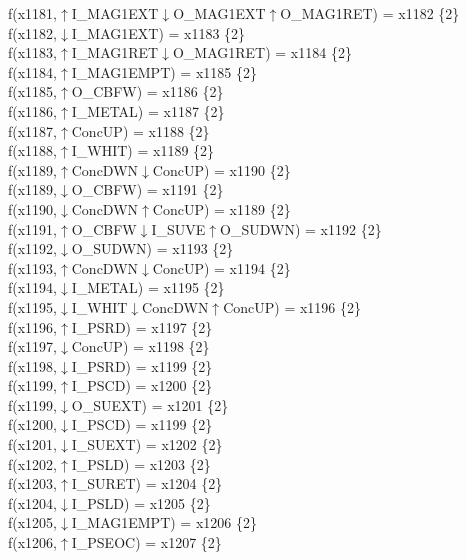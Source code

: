 f(x1181,$\uparrow$I\_MAG1EXT$\downarrow$O\_MAG1EXT$\uparrow$O\_MAG1RET) = x1182 \{2\} \\  
f(x1182,$\downarrow$I\_MAG1EXT) = x1183 \{2\} \\  
f(x1183,$\uparrow$I\_MAG1RET$\downarrow$O\_MAG1RET) = x1184 \{2\} \\  
f(x1184,$\uparrow$I\_MAG1EMPT) = x1185 \{2\} \\  
f(x1185,$\uparrow$O\_CBFW) = x1186 \{2\} \\  
f(x1186,$\uparrow$I\_METAL) = x1187 \{2\} \\  
f(x1187,$\uparrow$ConcUP) = x1188 \{2\} \\  
f(x1188,$\uparrow$I\_WHIT) = x1189 \{2\} \\  
f(x1189,$\uparrow$ConcDWN$\downarrow$ConcUP) = x1190 \{2\} \\  
f(x1189,$\downarrow$O\_CBFW) = x1191 \{2\} \\  
f(x1190,$\downarrow$ConcDWN$\uparrow$ConcUP) = x1189 \{2\} \\  
f(x1191,$\uparrow$O\_CBFW$\downarrow$I\_SUVE$\uparrow$O\_SUDWN) = x1192 \{2\} \\  
f(x1192,$\downarrow$O\_SUDWN) = x1193 \{2\} \\  
f(x1193,$\uparrow$ConcDWN$\downarrow$ConcUP) = x1194 \{2\} \\  
f(x1194,$\downarrow$I\_METAL) = x1195 \{2\} \\  
f(x1195,$\downarrow$I\_WHIT$\downarrow$ConcDWN$\uparrow$ConcUP) = x1196 \{2\} \\  
f(x1196,$\uparrow$I\_PSRD) = x1197 \{2\} \\  
f(x1197,$\downarrow$ConcUP) = x1198 \{2\} \\  
f(x1198,$\downarrow$I\_PSRD) = x1199 \{2\} \\  
f(x1199,$\uparrow$I\_PSCD) = x1200 \{2\} \\  
f(x1199,$\downarrow$O\_SUEXT) = x1201 \{2\} \\  
f(x1200,$\downarrow$I\_PSCD) = x1199 \{2\} \\  
f(x1201,$\downarrow$I\_SUEXT) = x1202 \{2\} \\  
f(x1202,$\uparrow$I\_PSLD) = x1203 \{2\} \\  
f(x1203,$\uparrow$I\_SURET) = x1204 \{2\} \\  
f(x1204,$\downarrow$I\_PSLD) = x1205 \{2\} \\  
f(x1205,$\downarrow$I\_MAG1EMPT) = x1206 \{2\} \\  
f(x1206,$\uparrow$I\_PSEOC) = x1207 \{2\} \\  
